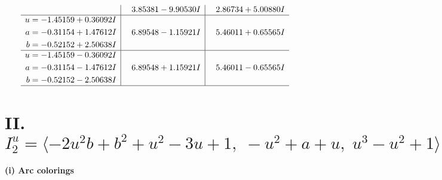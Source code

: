 \documentclass[1p]{elsarticle_modified}
\theoremstyle{definition}
\begin{document}
$$\begin{array}{c|c|c}
 & \phantom{-}3.85381 - 9.90530 I & \phantom{-}2.86734 + 5.00880 I \\ \hline\begin{aligned}
u &= -1.45159 + 0.36092 I \\
a &= -0.31154 + 1.47612 I \\
b &= -0.52152 + 2.50638 I\end{aligned}
 & \phantom{-}6.89548 - 1.15921 I & \phantom{-}5.46011 + 0.65565 I \\ \hline\begin{aligned}
u &= -1.45159 - 0.36092 I \\
a &= -0.31154 - 1.47612 I \\
b &= -0.52152 - 2.50638 I\end{aligned}
 & \phantom{-}6.89548 + 1.15921 I & \phantom{-}5.46011 - 0.65565 I\\
 \hline 
 \end{array}$$\newpage\newpage\renewcommand{\arraystretch}{1}
\centering \section*{II. $I^u_{2}= \langle -2 u^2 b+b^2+u^2-3 u+1,\;- u^2+a+u,\;u^3- u^2+1 \rangle$}
\flushleft \textbf{(i) Arc colorings}\\
\end{document}
